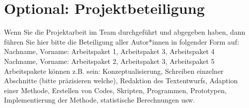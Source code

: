 \section{Optional: Projektbeteiligung}
Wenn Sie die Projektarbeit im Team durchgeführt und abgegeben haben, dann führen Sie hier bitte die Beteiligung aller Autor*innen in folgender Form auf:
\newline\\
\noindent
Nachname, Vorname: Arbeitspaket 1, Arbeitspaket 3, Arbeitspaket 4\\
Nachname, Vorname: Arbeitspaket 2, Arbeitspaket 3, Arbeitspaket 5
\newline\\
\noindent
Arbeitspakete können z.B. sein: Konzeptualisierung, Schreiben einzelner Abschnitte (bitte präzisieren welche), Redaktion des Textentwurfs, Adaption einer Methode, Erstellen von Codes, Skripten, Programmen, Prototypen, Implementierung der Methode, statistische Berechnungen usw. 